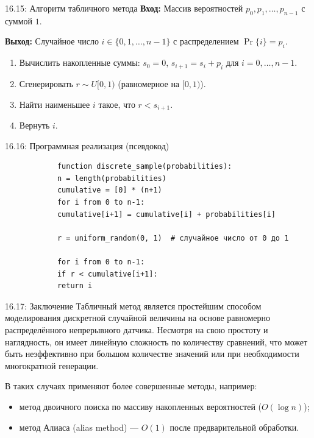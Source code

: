 \documentclass[a4paper,12pt]{article}
\begin{document}
	\begin{theorembox}{16.15: Алгоритм табличного метода}
		\textbf{Вход:} Массив вероятностей \(p_0, p_1, \dots, p_{n-1}\) с суммой \(1\).
		
		\textbf{Выход:} Случайное число \(i \in \{0, 1, \dots, n-1\}\) с распределением \(\Pr\{i\} = p_i\).
		
		\begin{enumerate}
			\item Вычислить накопленные суммы: \(s_0 = 0\), \(s_{i+1} = s_i + p_i\) для \(i = 0, \dots, n-1\).
			\item Сгенерировать \(r \sim U[0,1)\) (равномерное на \([0,1)\)).
			\item Найти наименьшее \(i\) такое, что \(r < s_{i+1}\).
			\item Вернуть \(i\).
		\end{enumerate}
	\end{theorembox}
	
	\begin{examplebox}{16.16: Программная реализация (псевдокод)}
		\begin{verbatim}
			function discrete_sample(probabilities):
			n = length(probabilities)
			cumulative = [0] * (n+1)
			for i from 0 to n-1:
			cumulative[i+1] = cumulative[i] + probabilities[i]
			
			r = uniform_random(0, 1)  # случайное число от 0 до 1
			
			for i from 0 to n-1:
			if r < cumulative[i+1]:
			return i
		\end{verbatim}
	\end{examplebox}
	
	\begin{notebook}{16.17: Заключение}
		Табличный метод является простейшим способом моделирования дискретной случайной величины на основе равномерно распределённого непрерывного датчика. Несмотря на свою простоту и наглядность, он имеет линейную сложность по количеству сравнений, что может быть неэффективно при большом количестве значений или при необходимости многократной генерации.
		
		В таких случаях применяют более совершенные методы, например:
		\begin{itemize}
			\item метод двоичного поиска по массиву накопленных вероятностей (\(O(\log n)\));
			\item метод Алиаса (alias method) — \(O(1)\) после предварительной обработки.
		\end{itemize}
	\end{notebook}
	
\end{document}
